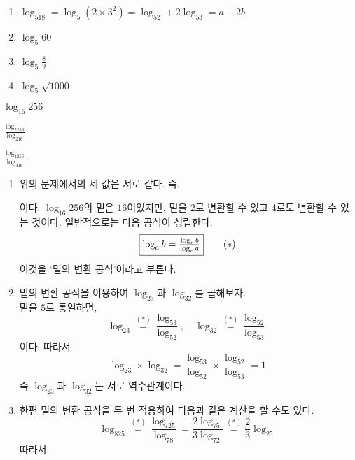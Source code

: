 \documentclass{oblivoir}
\begin{document}
%
\begin{enumerate}\label{prop6}
\item
\(\log_518=\log_5(2\times3^2)=\log_52+2\log_53=a+2b\)
\item
\(\log_5{60}\)
\item
\(\log_5\frac89\)
\item
\(\log_5\sqrt{1000}\)
\end{enumerate}

\newpage
%
\label{prop7}
\vspace{-10pt}\par\noindent
\begin{enumerate*}[itemjoin=\qquad\qquad\qquad]
\item
\(\log_{16}256\)
\item
\(\frac{\log_2256}{\log_216}\)
\item
\(\frac{\log_4256}{\log_416}\)
\end{enumerate*}

%
\exam{}
\begin{enumerate}\label{prop8}
\item
위의 문제에서의 세 값은 서로 같다.
즉,
\begin{center}
\qquad
{}
\end{center}
이다.
\(\log_{16}256\)의 밑은 \(16\)이었지만, 밑을 2로 변환할 수 있고 4로도 변환할 수 있는 것이다.
일반적으로는 다음 공식이 성립한다.
\[\fbox{\(\displaystyle\log_ab=\frac{\log_cb}{\log_ca}\)}\tag{$*$}\]
이것을 `밑의 변환 공식'이라고 부른다.
\item
밑의 변환 공식을 이용하여 \(\log_23\)과 \(\log_32\)를 곱해보자.\\
밑을 \(5\)로 통일하면,
\[\log_23\stackrel{(*)}=\frac{\log_53}{\log_52},\quad\log_32\stackrel{(*)}=\frac{\log_52}{\log_53}\]
이다.
따라서
\[\log_23\times\log_32=\frac{\log_53}{\log_52}\times\frac{\log_52}{\log_53}=1\]
즉 \(\log_23\)과 \(\log_32\)는 서로 역수관계이다.
\begin{center}
\end{center}
\item
한편 밑의 변환 공식을 두 번 적용하여 다음과 같은 계산을 할 수도 있다.
\[\log_825\stackrel{(*)}=\frac{\log_725}{\log_78}=\frac{2\log_75}{3\log_72}\stackrel{(*)}=\frac23\log_25\]
따라서
\begin{center}
\end{center}
\end{enumerate}
\end{document}
